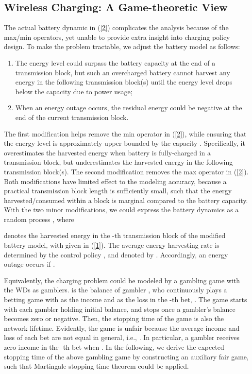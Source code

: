 \documentclass[conference]{IEEEtran}
\begin{document}
\subsection{Wireless Charging: A Game-theoretic View}
The actual battery dynamic in (\ref{2}) complicates the analysis because of the max/min operators, yet unable to provide extra insight into charging policy design. To make the problem tractable, we adjust the battery model as follows:
\begin{enumerate}
  \item The energy level could surpass the battery capacity at the end of a transmission block, but such an overcharged battery cannot harvest any energy in the following transmission block(s) until the energy level drops below the capacity due to power usage;
  \item When an energy outage occurs, the residual energy could be negative at the end of the current transmission block.
\end{enumerate}
The first modification helps remove the min operator in (\ref{2}), while ensuring that the energy level is approximately upper bounded by the capacity . Specifically, it overestimates the harvested energy when battery is fully-charged in a transmission block, but underestimates the harvested energy in the following transmission block(s). The second modification removes the max operator in (\ref{2}). Both modifications have limited effect to the modeling accuracy, because a practical transmission block length is sufficiently small, such that the energy harvested/consumed within a block is marginal compared to the battery capacity. With the two minor modifications, we could express the battery dynamics as a random process , where

denotes the harvested energy in the -th transmission block of the modified battery model, with  given in (\ref{1}). The average energy harvesting rate is determined by the control policy , and denoted by . Accordingly, an energy outage occurs if .

Equivalently, the charging problem could be modeled by a gambling game with the  WDs as gamblers.  is the balance of gambler , who continuously plays a betting game with  as the income and  as the loss in the -th bet, . The game starts with each gambler holding  initial balance, and stops once a gambler's balance becomes zero or negative. Then, the stopping time of the game is also the network lifetime. Evidently, the game is unfair because the average income and loss of each bet are not equal in general, i.e., . In particular, a gambler  receives zero income in the -th bet when . In the following, we derive the expected stopping time of the above gambling game by constructing an auxiliary fair game, such that Martingale stopping time theorem \cite{2001:Grimmett} could be applied.
\end{document}
